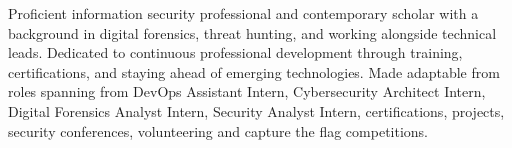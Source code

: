 \documentclass[letter,10pt]{article}
\begin{document}
Proficient information security professional and contemporary scholar with a background in digital forensics, threat hunting, and working alongside technical leads. Dedicated to continuous professional development through training, certifications, and staying ahead of emerging technologies. Made adaptable from roles spanning from DevOps Assistant Intern, Cybersecurity Architect Intern, Digital Forensics Analyst Intern, Security Analyst Intern, certifications, projects, security conferences, volunteering and capture the flag competitions. 
\end{document}
